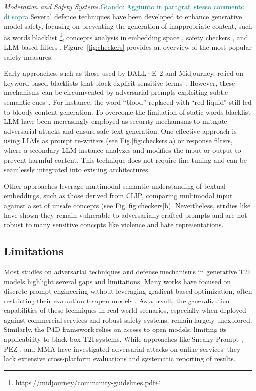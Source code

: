 \documentclass[acmsmall]{acmart}
\newcommand{\dalle}{DALL·E\xspace}
\newcommand{\virgolette}[1]{``#1''}
\newcommand{\giando}[1]{\textcolor{teal}{Giando: #1}}
\begin{document}
\textit{Moderation and Safety Systems.}\giando{Aggiunto in paragraf, stesso commento di sopra} Several defence techniques have been developed to enhance generative model safety, focusing on preventing the generation of inappropriate content, such as words blacklist \footnote{\href{https://docs.midjourney.com/docs/community-guidelines}{https://midjourney/community-guidelines.pdf}}, concepts analysis in embedding space \cite{rando2022red}, safety checkers \cite{leu2024auditing}, and LLM-based filters \cite{OpenAIModerationAPI}. Figure~\ref{fig:checkers} provides an overview of the most popular safety measures.

Early approaches, such as those used by \dalle~2 and Midjourney, relied on keyword-based blacklists that block explicit sensitive terms~\cite{mishkin2022dalle2}. However, these mechanisms can be circumvented by adversarial prompts exploiting subtle semantic cues~\cite{parrish2023adversarial}. For instance, the word \virgolette{blood} replaced with \virgolette{red liquid} still led to bloody content generation. To overcome the limitation of static words blacklist LLM have been increasingly employed as security mechanisms to mitigate adversarial attacks and ensure safe text generation\cite{phute2023llm}. One effective approach is using LLMs as prompt re-writers (see Fig.\ref{fig:checkers}a) or response filters, where a secondary LLM instance analyzes and modifies the input or output to prevent harmful content\cite{openai2024dalle3}. This technique does not require fine-tuning and can be seamlessly integrated into existing architectures. 

Other approaches leverage multimodal semantic understanding of textual embeddings, such as those derived from CLIP, comparing multimodal input against a set of unsafe concepts (see  Fig.\ref{fig:checkers}b). Nevertheless, studies like \cite{rando2022red} have shown they remain vulnerable to adversarially crafted prompts and are not robust to many sensitive concepts like violence and hate representations. 


\subsection{Limitations} \label{subsec:Limitations}
Most studies on adversarial techniques and defense mechanisms in generative T2I models highlight several gaps and limitations. Many works have focused on discrete prompt engineering without leveraging gradient-based optimization, often restricting their evaluation to open models \cite{schramowski2023safe,li2024art}. As a result, the generalization capabilities of these techniques in real-world scenarios, especially when deployed against commercial services and robust safety systems, remain largely unexplored. Similarly, the P4D framework \cite{chin2023prompting4debugging} relies on access to open models, limiting its applicability to black-box T2I systems. While approaches like Sneaky Prompt \cite{yang2023sneakyprompt}, PEZ \cite{wen2024hard}, and MMA \cite{yang2024mma} have investigated adversarial attacks on online services, they lack extensive cross-platform evaluations and systematic reporting of results.
\end{document}
